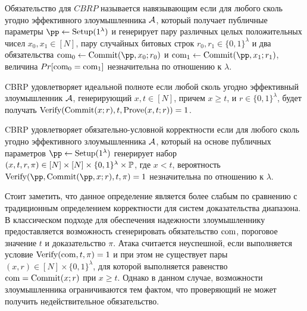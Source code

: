 
\begin{definition}
	Обязательство для $CBRP$ называется навязывающим если для любого сколь угодно эффективного злоумышленника $\A$, который получает публичные параметры $\pp \leftarrow \Setup(1^\lambda)$ и генерирует пару различных целых положительных чисел $x_0, x_1 \in [N]$, пару случайных битовых строк $r_0, r_1 \in \{0, 1\}^\lambda$ и два обязательства $\com_0 \leftarrow \Commit(\pp, x_0; r_0)$ и $\com_1 \leftarrow \Commit(\pp, x_1; r_1)$, величина $Pr[\com_0 = \com_1]$ незначительна по отношению к $\lambda$.
\end{definition}

\begin{definition}
	CBRP удовлетворяет идеальной полноте если любой сколь угодно эффективный злоумышленник $\A$, генерирующий $x, t \in [N]$, причем  $x \geq t$, и $r \in \{0, 1\}^\lambda$, будет получать $\Verify(\Commit(x; r), t, \Prove(x, t; r)) = 1$.
\end{definition}

\begin{definition}
	\label{definition:3}
	CBRP удовлетворяет обязательно-условной корректности если для любого сколь угодно эффективного злоумышленника $\A$, который на основе публичных параметров $\pp \leftarrow \Setup(1^\lambda)$ генерирует набор $(x, t, r, \pi) \in [N] \times [N] \times \{0, 1\}^\lambda \times \P$, где $x < t$, вероятность $\Verify(\pp, \Commit(\pp, x; r), t, \pi) = 1$ незначительна по отношению к $\lambda$.
\end{definition}

Стоит заметить, что данное определение является более слабым по сравнению с традиционным определением корректности для систем доказательства диапазона.
В классическом подходе для обеспечения надежности злоумышленнику предоставляется возможность сгенерировать обязательство $\com$, пороговое значение $t$ и доказательство $\pi$.
Атака считается неуспешной, если выполняется условие $\Verify(\com, t, \pi) = 1$ и при этом не существует пары $(x, r) \in [N] \times \{0, 1\}^\lambda$, для которой выполняется равенство $\com = \Commit(x; r)$ при $x \geq t$.
Однако в данном случае, возможности злоумышленника ограничиваются тем фактом, что проверяющий не может получить недействительное обязательство.

